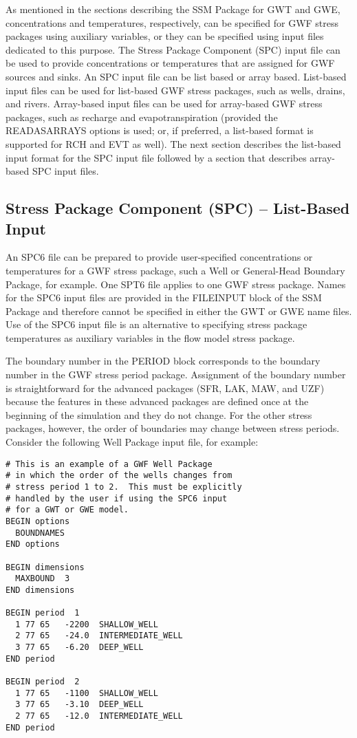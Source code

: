 As mentioned in the sections describing the SSM Package for GWT and GWE, concentrations and temperatures, respectively, can be specified for GWF stress packages using auxiliary variables, or they can be specified using input files dedicated to this purpose.  The Stress Package Component (SPC) input file can be used to provide concentrations or temperatures that are assigned for GWF sources and sinks.  An SPC input file can be list based or array based.  List-based input files can be used for list-based GWF stress packages, such as wells, drains, and rivers.  Array-based input files can be used for array-based GWF stress packages, such as recharge and evapotranspiration (provided the READASARRAYS options is used; or, if preferred, a list-based format is supported for RCH and EVT as well).  The next section describes the list-based input format for the SPC input file followed by a section that describes array-based SPC input files.

\subsection{Stress Package Component (SPC) -- List-Based Input}

An SPC6 file can be prepared to provide user-specified concentrations or temperatures for a GWF stress package, such a Well or General-Head Boundary Package, for example.  One SPT6 file applies to one GWF stress package.  Names for the SPC6 input files are provided in the FILEINPUT block of the SSM Package and therefore cannot be specified in either the GWT or GWE name files.  Use of the SPC6 input file is an alternative to specifying stress package temperatures as auxiliary variables in the flow model stress package.  

The boundary number in the PERIOD block corresponds to the boundary number in the GWF stress period package.  Assignment of the boundary number is straightforward for the advanced packages (SFR, LAK, MAW, and UZF) because the features in these advanced packages are defined once at the beginning of the simulation and they do not change.  For the other stress packages, however, the order of boundaries may change between stress periods.  Consider the following Well Package input file, for example:

\begin{verbatim}
# This is an example of a GWF Well Package
# in which the order of the wells changes from
# stress period 1 to 2.  This must be explicitly
# handled by the user if using the SPC6 input
# for a GWT or GWE model.
BEGIN options
  BOUNDNAMES
END options

BEGIN dimensions
  MAXBOUND  3
END dimensions

BEGIN period  1
  1 77 65   -2200  SHALLOW_WELL
  2 77 65   -24.0  INTERMEDIATE_WELL
  3 77 65   -6.20  DEEP_WELL
END period

BEGIN period  2
  1 77 65   -1100  SHALLOW_WELL
  3 77 65   -3.10  DEEP_WELL
  2 77 65   -12.0  INTERMEDIATE_WELL
END period
\end{verbatim}


